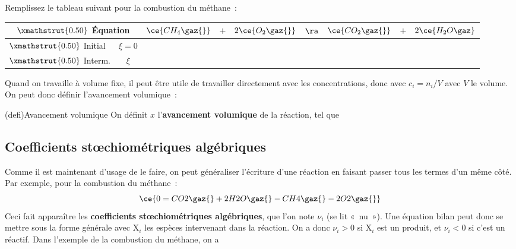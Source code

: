 \documentclass[../../main/main.tex]{subfiles}
\begin{document}
Remplissez le tableau suivant pour la combustion du méthane~:
\begin{center}
	\def\rhgt{0.50}
	\centering
	\begin{tabularx}{\linewidth}{|l|c|YdYdYdY|}
		\hline
		\multicolumn{2}{|c|}{
			$\xmathstrut{\rhgt}$
		\textbf{Équation}}                 &
		$\ce{CH_4\gaz{}}$                  & $+$       &
		$2\ce{O_2\gaz{}}$                  & $\ra$     &
		$\ce{CO_2\gaz{}}$                  & $+$       &
		$2\ce{H_2O\gaz}$                                 \\
		\hline
		$\xmathstrut{\rhgt}$
		Initial                            & $\xi = 0$ &
		       & \vline    &
		        & \vline    &
		       & \vline    &
		                       \\
		\hline
		$\xmathstrut{\rhgt}$
		Interm.                            & $\xi$     &
		 & \vline    &
		 & \vline    &
		 & \vline    &
		                \\
		\hline
	\end{tabularx}
\end{center}

Quand on travaille à volume fixe, il peut être utile de travailler directement
avec les concentrations, donc avec $c_i = n_i/V$ avec $V$ le volume. On peut
donc définir l'avancement volumique~:

\begin{tcb}[label=def:x, sidebyside, righthand ratio=.4](defi){Avancement volumique}
	On définit $x$ l'\textbf{avancement volumique} de la réaction, tel que
	\csw{
		\[
			\boxed{x = \frac{\xi}{V}}
		\]
	}
	\tcblower
\end{tcb}

\subsection{Coefficients stœchiométriques algébriques}

Comme il est maintenant d'usage de le faire, on peut généraliser l'écriture
d'une réaction en faisant passer tous les termes d'un même côté. Par exemple,
pour la combustion du méthane~:
\[
	\ce{0 = CO2\gaz{} + 2H2O\gaz{} - CH4\gaz{} - 2O2\gaz{}}
\]
Ceci fait apparaître les \textbf{coefficients stœchiométriques algébriques}, que
l'on note $\nu_i$ (se lit «~nu~»). Une équation bilan peut donc se mettre sous
la forme générale
\csw{
	\[
		\boxed{\sum_i \nu_i\mathrm{X}_i = 0}
	\]
}
avec $\mathrm{X}_i$ les espèces intervenant dans la réaction. On a donc $\nu_i
	>0$ si $\mathrm{X}_i$ est un produit, et $\nu_i < 0$ si c'est un réactif. Dans
l'exemple de la combustion du méthane, on a
\csw{
	\[
		\begin{array}{rcl}
			\nu_{\ce{CH4}} = -1 \qquad & \text{et} \qquad & \nu_{\ce{O2}}=-2 \\
			\nu_{\ce{CO2}} = 1 \qquad  & \text{et} \qquad & \nu_{\ce{H20}}=2
		\end{array}
	\]
}
\end{document}
